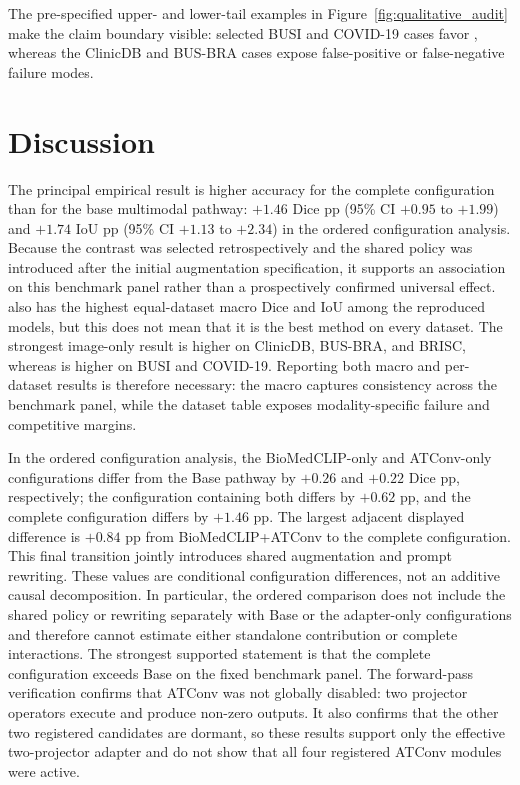 The pre-specified upper- and lower-tail examples in
Figure~\ref{fig:qualitative_audit} make the claim boundary visible: selected BUSI
and COVID-19 cases favor \methodname{}, whereas the ClinicDB and BUS-BRA cases
expose false-positive or false-negative failure modes.

\FloatBarrier
\section{Discussion}
The principal empirical result is higher accuracy for the complete configuration
than for the base multimodal pathway: $+1.46$ Dice pp (95\% CI $+0.95$ to
$+1.99$) and $+1.74$ IoU pp (95\% CI $+1.13$ to $+2.34$) in the ordered
configuration analysis. Because the contrast was selected retrospectively and
the shared policy was introduced after the initial augmentation specification,
it supports an association on this benchmark panel rather than a prospectively
confirmed universal effect. \methodname{} also has the highest equal-dataset
macro Dice and IoU among the reproduced models, but this does not mean that it
is the best method on every dataset.
The strongest image-only result is higher on ClinicDB, BUS-BRA, and BRISC,
whereas \methodname{} is higher on BUSI and COVID-19. Reporting both macro and
per-dataset results is therefore necessary: the macro captures consistency
across the benchmark panel, while the dataset table exposes modality-specific
failure and competitive margins.

In the ordered configuration analysis, the BioMedCLIP-only and ATConv-only configurations
differ from the Base pathway by $+0.26$ and $+0.22$ Dice pp, respectively; the
configuration containing both differs by $+0.62$ pp, and the complete configuration
differs by $+1.46$ pp. The largest adjacent displayed difference is $+0.84$ pp
from BioMedCLIP+ATConv to the complete configuration. This final transition
jointly introduces shared augmentation and prompt rewriting. These values are
conditional configuration differences, not an additive causal decomposition.
In particular, the ordered comparison does not include the shared policy or
rewriting separately with Base or the adapter-only configurations and therefore
cannot estimate either standalone contribution or complete interactions. The
strongest supported statement is that the complete configuration exceeds Base
on the fixed benchmark panel.
The forward-pass verification confirms that ATConv was not globally disabled: two projector
operators execute and produce non-zero outputs. It also confirms that the other
two registered candidates are dormant, so these results support only the
effective two-projector adapter and do not show that all four registered ATConv
modules were active.

